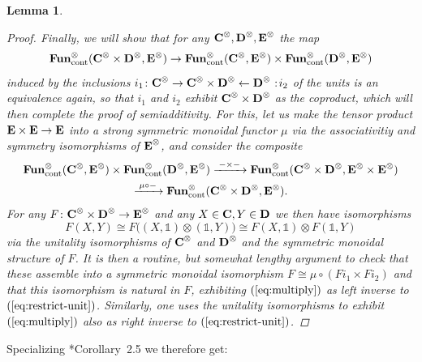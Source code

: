 \documentclass[reqno]{memo-l}
\theoremstyle{mythm}
\newtheorem{lemma}[thm]{Lemma}
\theoremstyle{definition}
\numberwithin{equation}{section}
\newcommand{\bbone}{{\mathds{1}}}
\newcommand{\cat}[1]{\textbf{\textup{#1}}}
\newcommand{\FUN}{\cat{Fun}}
\newcommand\noloc{%
	\nobreak
	\mspace{6mu plus 1mu}
	{:}
	\nonscript\mkern-\thinmuskip
	\mathpunct{}
	\mspace{2mu}
}
\newcommand{\cont}{\textup{cont}}
\begin{document}
\begin{lemma}
\begin{proof}
        Finally, we will show that for any $\cat{C}^\otimes,\cat{D}^\otimes,\cat{E}^\otimes$ the map
        \begin{equation}\label{eq:restrict-unit}
            \FUN_\cont^\otimes(\cat{C}^\otimes\times\cat{D}^\otimes,\cat{E}^\otimes)\to\FUN_\cont^\otimes(\cat{C}^\otimes,\cat{E}^\otimes)\times\FUN_\cont^\otimes(\cat{D}^\otimes,\cat{E}^\otimes)
        \end{equation}
        induced by the inclusions $i_1\colon\cat{C}^\otimes\to\cat{C}^\otimes\times\cat{D}^\otimes\gets\cat{D}^\otimes\noloc i_2$ of the units is an equivalence again, so that $i_1$ and $i_2$ exhibit $\cat{C}^\otimes\times\cat{D}^\otimes$ as the coproduct, which will then complete the proof of semiadditivity. For this, let us make the tensor product $\cat{E}\times\cat{E}\to\cat{E}$ into a strong symmetric monoidal functor $\mu$ via the associativitiy and symmetry isomorphisms of $\cat{E}^\otimes$, and consider the composite
        \begin{multline}\label{eq:multiply}
            \FUN_\cont^\otimes(\cat{C}^\otimes,\cat{E}^\otimes)\times\FUN_\cont^\otimes(\cat{D}^\otimes,\cat{E}^\otimes)\xrightarrow{\;{-}\times{-}\;}
            \FUN_\cont^\otimes(\cat{C}^\otimes\times\cat{D}^\otimes,\cat{E}^\otimes\times\cat{E}^\otimes)\\\xrightarrow{\;\mu\circ{-}\;}\FUN_\cont^\otimes(\cat{C}^\otimes\times\cat{D}^\otimes,\cat{E}^\otimes).
        \end{multline}
        For any $F\colon\cat{C}^\otimes\times\cat{D}^\otimes\to\cat{E}^\otimes$ and any $X\in\cat{C},Y\in\cat{D}$ we then have isomorphisms
        \[
            F(X,Y)\cong F\big((X,\bbone)\otimes(\bbone,Y)\big)\cong F(X,\bbone)\otimes F(\bbone,Y)
        \]
        via the unitality isomorphisms of $\cat{C}^\otimes$ and $\cat{D}^\otimes$ and the symmetric monoidal structure of $F$. It is then a routine, but somewhat lengthy argument to check that these assemble into a symmetric monoidal isomorphism $F\cong \mu\circ(Fi_1\times Fi_2)$ and that this isomorphism is natural in $F$, exhibiting $(\ref{eq:multiply})$ as left inverse to $(\ref{eq:restrict-unit})$. Similarly, one uses the unitality isomorphisms to exhibit $(\ref{eq:multiply})$ also as \emph{right} inverse to $(\ref{eq:restrict-unit})$.
    \end{proof}
\end{lemma}

Specializing \cite{Gepner-Groth-Nikolaus}*{Corollary~2.5} we therefore get:
\end{document}
